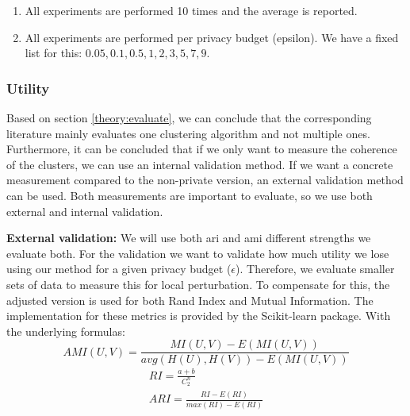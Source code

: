 \begin{enumerate}
  \item All experiments are performed 10 times and the average is reported.
  \item All experiments are performed per privacy budget (epsilon).
        We have a fixed list for this: ${0.05, 0.1, 0.5, 1, 2, 3, 5, 7, 9}$.
\end{enumerate}

\subsubsection{Utility}
Based on section \ref{theory:evaluate}, we can conclude that the corresponding literature mainly evaluates one clustering algorithm and not multiple ones.
Furthermore, it can be concluded that if we only want to measure the coherence of the clusters, we can use an internal validation method. If we want a concrete measurement compared to the non-private version, an external validation method can be used.
Both measurements are important to evaluate, so we use both external and internal validation. \newline

\textbf{External validation:}
We will use both \gls{ari} and \gls{ami} different strengths we evaluate both.
For the validation we want to validate how much utility we lose using our method for a given privacy budget ($\epsilon$).
Therefore, we evaluate smaller sets of data to measure this for local perturbation.
To compensate for this, the adjusted version is used for both Rand Index and Mutual Information.
The implementation for these metrics is provided by the Scikit-learn package.
With the underlying formulas:
\begin{equation}
  AMI(U, V) = \frac{MI(U, V) - E(MI(U, V))}{avg(H(U), H(V)) - E(MI(U, V))}
\end{equation}
\begin{gather}
  RI = \frac{a + b}{C^{n}_{2}} \\
  ARI = \frac{RI - E(RI)}{max(RI) - E(RI)}
\end{gather}

